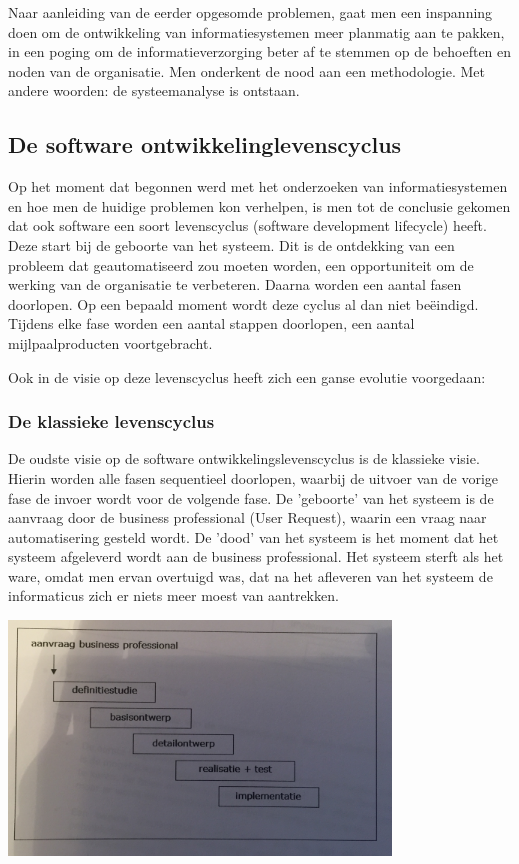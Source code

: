 Naar aanleiding van de eerder opgesomde problemen, gaat men een inspanning doen om de ontwikkeling van informatiesystemen meer planmatig aan te pakken, in een poging om de informatieverzorging beter af te stemmen op de behoeften en noden van de organisatie. Men onderkent de nood aan een methodologie. Met andere woorden: de systeemanalyse is ontstaan.

\subsection{De software ontwikkelinglevenscyclus}

Op het moment dat begonnen werd met het onderzoeken van informatiesystemen en hoe men de huidige problemen kon verhelpen, is men tot de conclusie gekomen dat ook software een soort levenscyclus (software development lifecycle) heeft. Deze start bij de geboorte van het systeem. Dit is de ontdekking van een probleem dat geautomatiseerd zou moeten worden, een opportuniteit om de werking van de organisatie te verbeteren. Daarna worden een aantal fasen doorlopen. Op een bepaald moment wordt deze cyclus al dan niet beëindigd.
Tijdens elke fase worden een aantal stappen doorlopen, een aantal mijlpaalproducten voortgebracht.

Ook in de visie op deze levenscyclus heeft zich een ganse evolutie voorgedaan:

\subsubsection{De klassieke levenscyclus}

De oudste visie op de software ontwikkelingslevenscyclus is de klassieke visie. Hierin worden alle fasen sequentieel doorlopen, waarbij de uitvoer van de vorige fase de invoer wordt voor de volgende fase. De 'geboorte' van het systeem is de aanvraag door de business professional (User Request), waarin een vraag naar automatisering gesteld wordt. De 'dood' van het systeem is het moment dat het systeem afgeleverd wordt aan de business professional. Het systeem sterft als het ware, omdat men ervan overtuigd was, dat na het afleveren van het systeem de informaticus zich er niets meer moest van aantrekken.


\begin{center}
\includegraphics[width=4in]{img/IMG_3586}%
\end{center}

